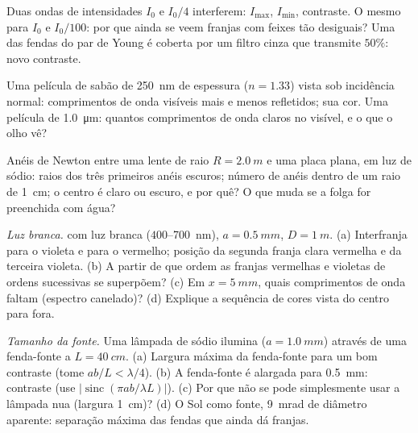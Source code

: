 \begin{exercise}[$\star$]\label{exo:b2:two-wave-interference:2}
Duas ondas de intensidades $I_0$ e $I_0/4$ interferem: $I_{\max}$, $I_{\min}$,
contraste. O mesmo para $I_0$ e $I_0/100$: por que ainda se veem franjas
com feixes tão desiguais? Uma das fendas do par de Young é coberta por um
filtro cinza que transmite $50\%$: novo contraste.
\end{exercise}

\begin{exercise}[$\star$]\label{exo:b2:two-wave-interference:3}
Uma película de sabão de \qty{250}{nm} de espessura ($n = 1.33$) vista sob incidência normal:
comprimentos de onda visíveis mais e menos refletidos; sua cor. Uma película de
\qty{1.0}{\micro m}: quantos comprimentos de onda claros no visível, e o
que o olho vê?
\end{exercise}

\begin{exercise}[$\star$]\label{exo:b2:two-wave-interference:4}
Anéis de Newton entre uma lente de raio $R = \qty{2.0}{m}$ e uma placa plana, em
luz de sódio: raios dos três primeiros anéis escuros; número de anéis
dentro de um raio de \qty{1}{cm}; o centro é claro ou escuro, e por quê?
O que muda se a folga for preenchida com água?
\end{exercise}

\begin{exercise}[$\star\star$]\label{exo:b2:two-wave-interference:5}
\emph{Luz branca.}  com luz branca ($400$--\qty{700}{nm}),
$a = \qty{0.5}{mm}$, $D = \qty{1}{m}$. (a) Interfranja para o violeta e para o vermelho;
posição da segunda franja clara vermelha e da terceira violeta. (b)
A partir de que ordem as franjas vermelhas e violetas de ordens sucessivas
se superpõem? (c) Em $x = \qty{5}{mm}$, quais comprimentos de onda faltam
(espectro canelado)? (d) Explique a sequência de cores vista do
centro para fora.
\end{exercise}

\begin{exercise}[$\star\star$]\label{exo:b2:two-wave-interference:6}
\emph{Tamanho da fonte.} Uma lâmpada de sódio ilumina  ($a = \qty{1.0}{mm}$)
através de uma fenda-fonte a $L = \qty{40}{cm}$. (a) Largura máxima da
fenda-fonte para um bom contraste (tome $ab/L < \lambda/4$). (b) A fenda-fonte
é alargada para \qty{0.5}{mm}: contraste (use $|\operatorname{sinc}(\pi ab/\lambda L)|$).
(c) Por que não se pode simplesmente usar a lâmpada nua (largura \qty{1}{cm})? (d) O
Sol como fonte, \qty{9}{mrad} de diâmetro aparente: separação máxima das fendas que
ainda dá franjas.
\end{exercise}

